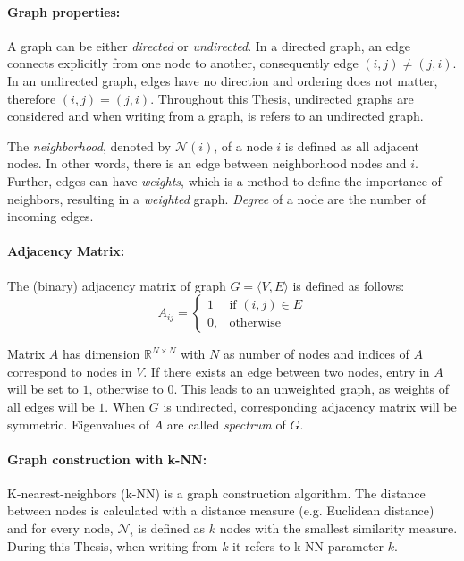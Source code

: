 \paragraph{Graph properties:}
A graph can be either \textit{directed} or \textit{undirected}. 
In a directed graph, an edge connects explicitly from one node to another, consequently edge $(i, j) \neq (j, i)$. 
In an undirected graph, edges have no direction and ordering does not matter, therefore $(i, j) = (j, i)$.
Throughout this Thesis, undirected graphs are considered and when writing from a graph, is refers to an undirected graph.

The \textit{neighborhood}, denoted by $\mathcal{N}(i)$, of a node $i$  is defined as all adjacent nodes.
In other words, there is an edge between neighborhood nodes and $i$. 
Further, edges can have \textit{weights}, which is a method to define the importance of neighbors, resulting in a \textit{weighted} graph.
\textit{Degree} of a node are the number of incoming edges.

\paragraph{Adjacency Matrix:}
The (binary) adjacency matrix of graph $G = \langle V, E \rangle$ is defined as follows:
\begin{equation}
    \label{eg:AdjacencyMatrix}
    A_{ij} =    
    \begin{cases}
        1  & \text{if } (i, j) \in E \\
        0, & \text{otherwise}
    \end{cases}
\end{equation}

Matrix $A$ has dimension $\mathbb{R}^{N \times N}$ with $N$ as number of nodes
and indices of $A$ correspond to nodes in $V$.
If there exists an edge between two nodes, entry in $A$ will be set to $1$, otherwise to $0$.
This leads to an unweighted graph, as weights of all edges will be $1$.
When $G$ is undirected, corresponding adjacency matrix will be symmetric. 
Eigenvalues of $A$ are called \textit{spectrum} of $G$.

\paragraph{Graph construction with k-NN:}
K-nearest-neighbors (k-NN) is a graph construction algorithm. The distance between
nodes is calculated with a distance measure (e.g. Euclidean distance) and 
for every node, $\mathcal{N}_i$ is defined as $k$ nodes with the smallest similarity measure.
During this Thesis, when writing from $k$ it refers to k-NN parameter $k$.


